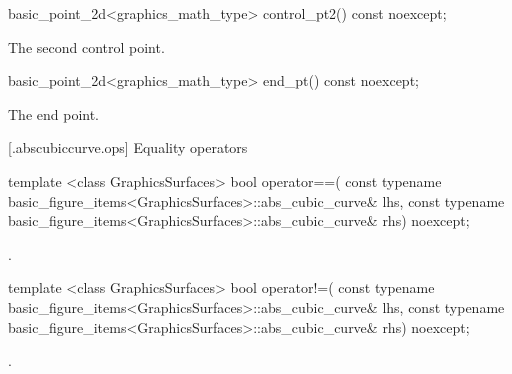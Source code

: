 %
\begin{itemdecl}
basic_point_2d<graphics_math_type> control_pt2() const noexcept;
\end{itemdecl}
\begin{itemdescr}
\pnum
\returns The second control point.
\end{itemdescr}

%
\begin{itemdecl}
basic_point_2d<graphics_math_type> end_pt() const noexcept;
\end{itemdecl}
\begin{itemdescr}
\pnum
\returns The end point.
\end{itemdescr}

 [\iotwod.abscubiccurve.ops] {Equality operators}%

%
\begin{itemdecl}
template <class GraphicsSurfaces>
bool operator==(
  const typename basic_figure_items<GraphicsSurfaces>::abs_cubic_curve& lhs,
  const typename basic_figure_items<GraphicsSurfaces>::abs_cubic_curve& rhs) 
  noexcept;
\end{itemdecl}
\begin{itemdescr}
\pnum
\returns
{}.
\end{itemdescr}

%
\begin{itemdecl}
template <class GraphicsSurfaces>
bool operator!=(
  const typename basic_figure_items<GraphicsSurfaces>::abs_cubic_curve& lhs,
  const typename basic_figure_items<GraphicsSurfaces>::abs_cubic_curve& rhs) 
  noexcept;
\end{itemdecl}
\begin{itemdescr}
\pnum
\returns
{}.
\end{itemdescr}
